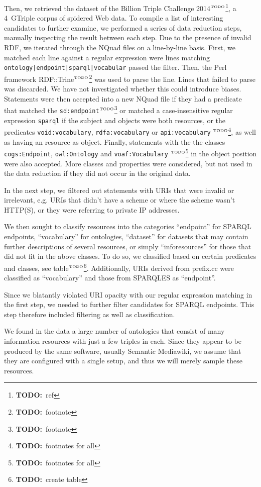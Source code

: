 \documentclass{article}
\newcommand{\rdfterm}[1]{\texttt{#1}}
\newcommand{\todo}[1]{\ensuremath{^{\textrm{\tiny{TODO}\normalsize}}}\footnote{\textbf{TODO:}~#1}}
\begin{document}
Then, we retrieved the dataset of the Billion Triple Challenge
2014\todo{ref}, a 4~GTriple corpus of spidered Web data. To compile a
list of interesting candidates to further examine, we performed a
series of data reduction steps, manually inspecting the result between
each step. Due to the presence of invalid RDF, we
iterated through the NQuad files on a line-by-line basis. First, we
matched each line against a regular expression were lines matching
\texttt{ontology|endpoint|sparql|vocabular} passed the filter. Then,
the Perl framework RDF::Trine\todo{footnote} was used to parse
the line. Lines that failed to parse was discarded. We have not
investigated whether this could introduce biases. Statements were then
accepted into a new NQuad file if they had a predicate that matched
the \rdfterm{sd:endpoint}\todo{footnote} or matched a case-insensitive
regular expression \texttt{sparql} if the subject and objects were
both resources, or the predicates \rdfterm{void:vocabulary},
\rdfterm{rdfa:vocabulary} or \rdfterm{api:vocabulary} \todo{footnotes
  for all}, as well as having an resource as object. Finally,
statements with the the classes \rdfterm{cogs:Endpoint},
\rdfterm{owl:Ontology} and \rdfterm{voaf:Vocabulary} \todo{footnotes for
  all} in the object position were also accepted. More classes and
properties were considered, but not used in the data reduction if they
did not occur in the original data.

In the next step, we filtered out statements with URIs that were
invalid or irrelevant, e.g. URIs that didn't have a scheme or where
the scheme wasn't HTTP(S), or they were referring to private IP addresses.

We then sought to classify resources into the categories ``endpoint''
for SPARQL endpoints, ``vocabulary'' for ontologies, ``dataset'' for
datasets that may contain further descriptions of several resources,
or simply ``inforesources'' for those that did not fit in the above
classes. To do so, we classified based on certain predicates and
classes, see table\todo{create table}. Additionally, URIs derived from
prefix.cc were classified as ``vocabulary'' and those from SPARQLES as
``endpoint''.

Since we blatantly violated URI opacity with our regular expression
matching in the first step, we needed to further filter candidates for
SPARQL endpoints. This step therefore included filtering as well as
classification.

We found in the data a large number of ontologies that consist of many
information resources with just a few triples in each. Since they
appear to be produced by the same software, usually Semantic
Mediawiki, we assume that they are configured with a single setup, and
thus we will merely sample these resources.
\end{document}
